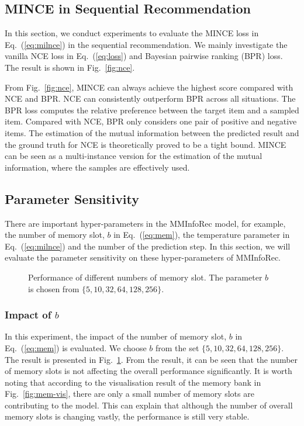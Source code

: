 \documentclass[conference]{IEEEtran}
\begin{document}
\subsection{MINCE in Sequential Recommendation}
\label{sec:nce-exp}
In this section, we conduct experiments to evaluate the MINCE loss in Eq.~(\ref{eq:milnce}) in the sequential recommendation. We mainly investigate the vanilla NCE loss in Eq.~(\ref{eq:loss}) and Bayesian pairwise ranking (BPR) loss. The result is shown in Fig.~\ref{fig:nce}.

From Fig.~\ref{fig:nce}, MINCE can always achieve the highest score compared with NCE and BPR. NCE can consistently outperform BPR across all situations. The BPR loss computes the relative preference between the target item and a sampled item. Compared with NCE, BPR only considers one pair of positive and negative items. The estimation of the mutual information between the predicted result and the ground truth for NCE is theoretically proved to be a tight bound. MINCE can be seen as a multi-instance version for the estimation of the mutual information, where the samples are effectively used.

\subsection{Parameter Sensitivity}
\label{sec:param-exp}
There are important hyper-parameters in the MMInfoRec model, for example, the number of memory slot, $b$ in Eq.~(\ref{eq:mem}), the temperature parameter in Eq.~(\ref{eq:milnce}) and the number of the prediction step. In this section, we will evaluate the parameter sensitivity on these hyper-parameters of MMInfoRec.

\begin{figure}[t]
    \centering
    \caption{Performance of different numbers of memory slot. The parameter $b$ is chosen from $\{5,10,32,64,128,256\}$.}
\label{fig:mem-param}
\end{figure}

\subsubsection{Impact of $b$}
In this experiment, the impact of the number of memory slot, $b$ in Eq.~(\ref{eq:mem}) is evaluated. We choose $b$ from the set $\{5,10,32,64,128,256\}$. The result is presented in Fig.~\ref{fig:mem-param}. From the result, it can be seen that the number of memory slots is not affecting the overall performance significantly. It is worth noting that according to the visualisation result of the memory bank in Fig.~\ref{fig:mem-vis}, there are only a small number of memory slots are contributing to the model. This can explain that although the number of overall memory slots is changing vastly, the performance is still very stable.
\end{document}
